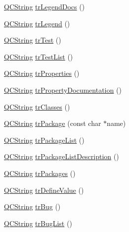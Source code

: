 \begin{DoxyCompactItemize}
\item 
\mbox{\hyperlink{class_q_c_string}{Q\+C\+String}} \mbox{\hyperlink{class_translator_dutch_a7e0e4b56a867fa4af556b2bb8677a62d}{tr\+Legend\+Docs}} ()
\item 
\mbox{\hyperlink{class_q_c_string}{Q\+C\+String}} \mbox{\hyperlink{class_translator_dutch_a3767a87324b1f75b42cf70072625cb55}{tr\+Legend}} ()
\item 
\mbox{\hyperlink{class_q_c_string}{Q\+C\+String}} \mbox{\hyperlink{class_translator_dutch_a06afe7808d93f5c37219cc9853bb0cfe}{tr\+Test}} ()
\item 
\mbox{\hyperlink{class_q_c_string}{Q\+C\+String}} \mbox{\hyperlink{class_translator_dutch_a1b28f1d7fb1f18e4140a49dce53ce130}{tr\+Test\+List}} ()
\item 
\mbox{\hyperlink{class_q_c_string}{Q\+C\+String}} \mbox{\hyperlink{class_translator_dutch_a5634a2d94a9f2aef3b38e5e0ec91db0f}{tr\+Properties}} ()
\item 
\mbox{\hyperlink{class_q_c_string}{Q\+C\+String}} \mbox{\hyperlink{class_translator_dutch_ad58c7ae26a75336f2a67eabfc3858389}{tr\+Property\+Documentation}} ()
\item 
\mbox{\hyperlink{class_q_c_string}{Q\+C\+String}} \mbox{\hyperlink{class_translator_dutch_aa31c2428cf745783fb68b73ad270dc58}{tr\+Classes}} ()
\item 
\mbox{\hyperlink{class_q_c_string}{Q\+C\+String}} \mbox{\hyperlink{class_translator_dutch_aaec0a1183dccae376b65520e85389ac4}{tr\+Package}} (const char $\ast$name)
\item 
\mbox{\hyperlink{class_q_c_string}{Q\+C\+String}} \mbox{\hyperlink{class_translator_dutch_a2c00c3631db34456fedcb30e0155868e}{tr\+Package\+List}} ()
\item 
\mbox{\hyperlink{class_q_c_string}{Q\+C\+String}} \mbox{\hyperlink{class_translator_dutch_a498b5392e984f25b4caf489883159ea9}{tr\+Package\+List\+Description}} ()
\item 
\mbox{\hyperlink{class_q_c_string}{Q\+C\+String}} \mbox{\hyperlink{class_translator_dutch_a62e097fe0af07f5f470df1f8cf367a83}{tr\+Packages}} ()
\item 
\mbox{\hyperlink{class_q_c_string}{Q\+C\+String}} \mbox{\hyperlink{class_translator_dutch_aba057ef360f8d5f2c47713924302bec2}{tr\+Define\+Value}} ()
\item 
\mbox{\hyperlink{class_q_c_string}{Q\+C\+String}} \mbox{\hyperlink{class_translator_dutch_add919f86916e0494e966a4637a0ab19e}{tr\+Bug}} ()
\item 
\mbox{\hyperlink{class_q_c_string}{Q\+C\+String}} \mbox{\hyperlink{class_translator_dutch_a243e10d7ef2cb19180708078b93ed1fb}{tr\+Bug\+List}} ()

\end{DoxyCompactItemize}
